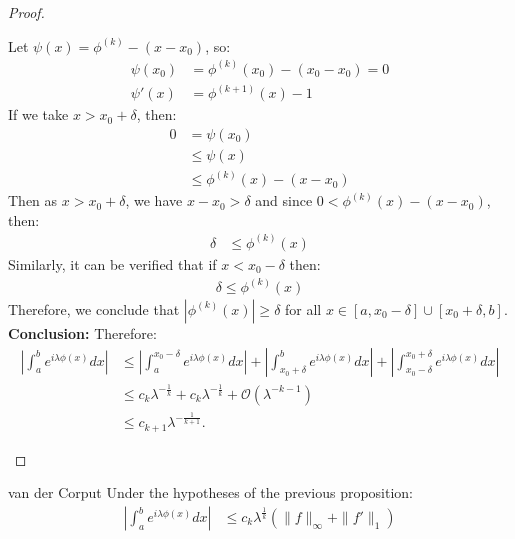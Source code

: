 \begin{proof}{}
\begin{itemize}
\begin{itemize}
          Let $\psi(x)=\phi^{(k)}-(x-x_0)$, so:
          \begin{align*}
            \psi(x_0)&=\phi^{(k)}(x_0)-(x_0-x_0)=0\\
            \psi'(x)&=\phi^{(k+1)}(x)-1
          \end{align*}
          If we take $x>x_0+\delta$, then:
          \begin{align*}
            0&=\psi(x_0)\\
            &\leq\psi(x)\\
            &\leq\phi^{(k)}(x)-(x-x_0)
          \end{align*}
          Then as $x>x_0+\delta$, we have $x-x_0>\delta$ and since $0<\phi^{(k)}(x)-(x-x_0)$, then:
          \begin{align*}
            \delta &\leq \phi^{(k)}(x) 
          \end{align*}
          Similarly, it can be verified that if $x<x_0-\delta$ then:
          \begin{align*}
            \delta \leq \phi^{(k)}(x)
          \end{align*}
          Therefore, we conclude that $|\phi^{(k)}(x)|\geq\delta$ for all $x\in[a,x_0-\delta]\cup[x_0+\delta,b]$.\\
          \textbf{Conclusion:} Therefore:
          \begin{align*}
            \left| \int_{a}^{b} e^{i\lambda\phi(x)}dx\right|&\leq\left|\int_{a}^{x_0-\delta}e^{i\lambda\phi(x)}dx\right|+\left|\int_{x_0+\delta}^{b}e^{i\lambda\phi(x)}dx\right|+\left|\int_{x_0-\delta}^{x_0+\delta}e^{i\lambda\phi(x)}dx\right|\\
            &\leq c_k\lambda^{-\frac{1}{k}}+c_k\lambda^{-\frac{1}{k}}+\mathcal{O}(\lambda^{-k-1})\\
            &\leq c_{k+1}\lambda^{-\frac{1}{k+1}}.
          \end{align*}
      \end{itemize}
  \end{itemize}
\end{proof}
\begin{corollary}{van der Corput}
  Under the hypotheses of the previous proposition:
  \begin{align*}
    \left| \int_{a}^{b} e^{i\lambda\phi(x)}dx\right|&\leq c_k\lambda^{\frac{1}{k}}(\|f\|_{\infty}+\|f'\|_{1}) 
  \end{align*}
\end{corollary}
